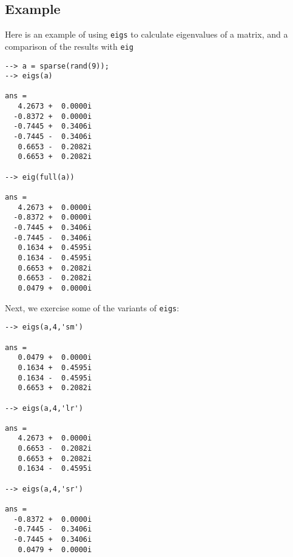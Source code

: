 \subsection{Example}

Here is an example of using \verb|eigs| to calculate eigenvalues
of a matrix, and a comparison of the results with \verb|eig|
\begin{verbatim}
--> a = sparse(rand(9));
--> eigs(a)

ans = 
   4.2673 +  0.0000i 
  -0.8372 +  0.0000i 
  -0.7445 +  0.3406i 
  -0.7445 -  0.3406i 
   0.6653 -  0.2082i 
   0.6653 +  0.2082i 

--> eig(full(a))

ans = 
   4.2673 +  0.0000i 
  -0.8372 +  0.0000i 
  -0.7445 +  0.3406i 
  -0.7445 -  0.3406i 
   0.1634 +  0.4595i 
   0.1634 -  0.4595i 
   0.6653 +  0.2082i 
   0.6653 -  0.2082i 
   0.0479 +  0.0000i 
\end{verbatim}
Next, we exercise some of the variants of \verb|eigs|:
\begin{verbatim}
--> eigs(a,4,'sm')

ans = 
   0.0479 +  0.0000i 
   0.1634 +  0.4595i 
   0.1634 -  0.4595i 
   0.6653 +  0.2082i 

--> eigs(a,4,'lr')

ans = 
   4.2673 +  0.0000i 
   0.6653 -  0.2082i 
   0.6653 +  0.2082i 
   0.1634 -  0.4595i 

--> eigs(a,4,'sr')

ans = 
  -0.8372 +  0.0000i 
  -0.7445 -  0.3406i 
  -0.7445 +  0.3406i 
   0.0479 +  0.0000i 
\end{verbatim}

